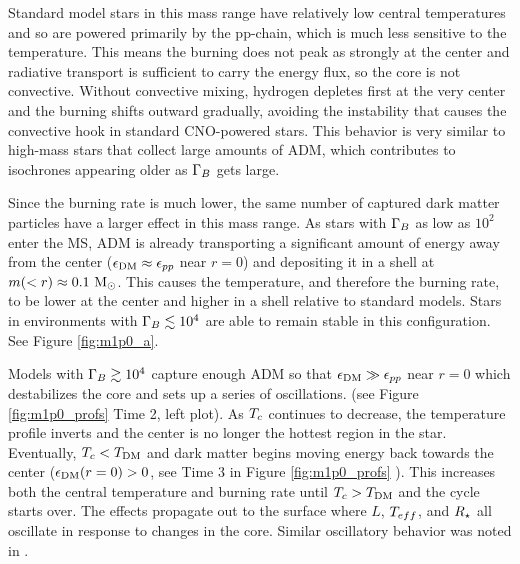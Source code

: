 \documentclass[useAMS,usenatbib]{mnras}
\begin{document}
  Standard model stars in this mass range have relatively low central temperatures and so are powered primarily by the pp-chain, which is much less sensitive to the temperature. This means the burning does not peak as strongly at the center and radiative transport is sufficient to carry the energy flux, so the core is not convective. Without convective mixing, hydrogen depletes first at the very center and the burning shifts outward gradually, avoiding the instability that causes the convective hook in standard CNO-powered stars. This behavior is very similar to high-mass stars that collect large amounts of ADM, which contributes to isochrones appearing older as $\Gamma_B$ gets large.

  Since the burning rate is much lower, the same number of captured dark matter particles have a larger effect in this mass range. As stars with $\Gamma_B$ as low as $10^2$  enter the MS, ADM is already transporting a significant amount of energy away from the center ($\epsilon_{\mathrm{DM}} \approx \epsilon_{pp}$ near $r=0$) and depositing it in a shell at $m(<r) \approx 0.1 \ \mathrm{M}_{\odot}$. This causes the temperature, and therefore the burning rate, to be lower at the center and higher in a shell relative to standard models. Stars in environments with $\Gamma_B \lesssim 10^4$ are able to remain stable in this configuration. See Figure \ref{fig:m1p0_a}.

  Models with $\Gamma_B \gtrsim 10^4$ capture enough ADM so that $\epsilon_{\mathrm{DM}} \gg \epsilon_{pp}$ near $r=0$ which destabilizes the core and sets up a series of oscillations. 
  (see Figure \ref{fig:m1p0_profs} Time 2, left plot). As $T_c$ continues to decrease, the temperature profile inverts and the center is no longer the hottest region in the star. Eventually, $T_c < T_{\mathrm{DM}}$ and dark matter begins moving energy back towards the center ($\epsilon_{\mathrm{DM}}(r=0) > 0$, see Time 3 in Figure \ref{fig:m1p0_profs} ). This increases both the central temperature and burning rate until $T_c > T_{\mathrm{DM}}$ and the cycle starts over. The effects propagate out to the surface where
  $L$, $T_{eff}$, and $R_{\star}$ all oscillate in response to changes in the core. Similar oscillatory behavior was noted in \citet{Iocco2012} .
\end{document}
